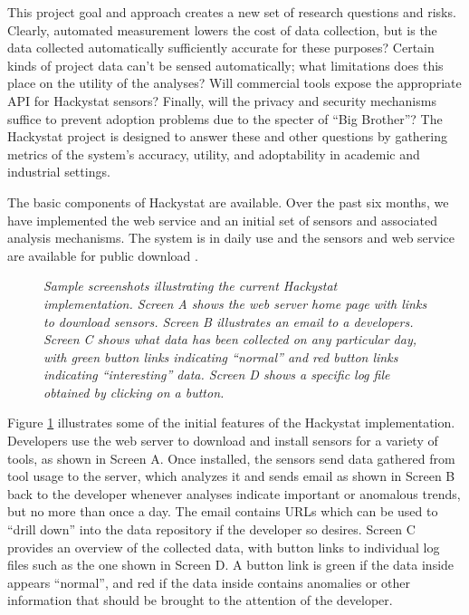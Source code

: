 This project goal and approach creates a new set of research questions and
risks.  Clearly, automated measurement lowers the cost of data collection,
but is the data collected automatically sufficiently accurate for these
purposes?  Certain kinds of project data can't be sensed automatically;
what limitations does this place on the utility of the analyses? Will
commercial tools expose the appropriate API for Hackystat sensors?
Finally, will the privacy and security mechanisms suffice to prevent
adoption problems due to the specter of ``Big Brother''?  The Hackystat
project is designed to answer these and other questions by gathering
metrics of the system's accuracy, utility, and adoptability in academic and
industrial settings.

The basic components of Hackystat are available. Over the past six
months, we have implemented the web service and an initial set of sensors
and associated analysis mechanisms.  The system is in daily use and the
sensors and web service are available for public download \cite{Hackystat}.

\begin{figure}[t]
 {\centerline {}}
 \caption{{\em Sample screenshots illustrating the current Hackystat
 implementation. Screen A shows the web server home page with links to
 download sensors. Screen B illustrates an email to a developers. Screen C 
shows what data has been collected on any particular day, with green button links 
indicating ``normal'' and red button links indicating ``interesting''
data. Screen D shows a specific log file obtained by clicking on a button.}}
 \label{fig:screenshots}
\end{figure}

Figure \ref{fig:screenshots} illustrates some of the initial features of
the Hackystat implementation.  Developers use the web server to download
and install sensors for a variety of tools, as shown in Screen A.  Once
installed, the sensors send data gathered from tool usage to the server,
which analyzes it and sends email as shown in Screen B back to the
developer whenever analyses indicate important or anomalous trends, but no
more than once a day.  The email contains URLs which can be used to ``drill
down'' into the data repository if the developer so desires. Screen C
provides an overview of the collected data, with button links to individual
log files such as the one shown in Screen D.  A button link is green if the
data inside appears ``normal'', and red if the data inside contains
anomalies or other information that should be brought to the attention of
the developer.

